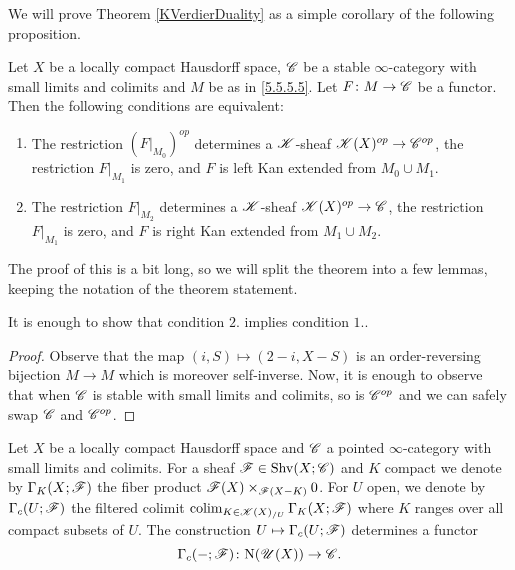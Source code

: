 \documentclass[../../thesis.tex]{subfiles}
\begin{document}
We will prove Theorem \ref{KVerdierDuality} as a simple corollary of the following proposition.
\begin{proposition}[{\cite[Proposition 5.5.5.7]{HA}}]\label{5.5.5.7}
    Let $X$ be a locally compact Hausdorff space, $\mathscr{C}$ be a stable $\infty$-category with small limits and colimits and $M$ be as in \ref{5.5.5.5}.
    Let $F \colon M \to \mathscr{C}$ be a functor.
    Then the following conditions are equivalent:
    \begin{enumerate}
        \item The restriction $(F|_{M_0})^{op}$ determines a $\mathscr{K}$-sheaf \hspace{0.25em}$\mathscr{K}(X)^{op} \to \mathscr{C}^{op}$, the restriction $F|_{M_1}$ is zero, and $F$ is left Kan extended from $M_0 \cup M_1$.
        \item The restriction $F|_{M_2}$ determines a $\mathscr{K}$-sheaf \hspace{0.25em}$\mathscr{K}(X)^{op} \to \mathscr{C}$, the restriction $F|_{M_1}$ is zero, and $F$ is right Kan extended from $M_1 \cup M_2$.
    \end{enumerate}
\end{proposition}
The proof of this is a bit long, so we will split the theorem into a few lemmas, keeping the notation of the theorem statement.
\begin{lemma}
    It is enough to show that condition $2.$ implies condition $1.$.
\end{lemma}
\begin{proof}
    Observe that the map $(i,S) \mapsto (2-i, X-S)$ is an order-reversing bijection $M\to M$ which is moreover self-inverse.
    Now, it is enough to observe that when $\mathscr{C}$ is stable with small limits and colimits, so is $\mathscr{C}^{op}$ and we can safely swap $\mathscr{C}$ and $\mathscr{C}^{op}$.
\end{proof}
\begin{definition}[{\cite[Definition 5.5.5.9]{HA}}]
    Let $X$ be a locally compact Hausdorff space and $\mathscr{C}$ a pointed $\infty$-category with small limits and colimits.
    For a sheaf $\mathscr{F} \in \mathrm{Shv}(X;\mathscr{C})$ and $K$ compact we denote by $\Gamma_K(X;\mathscr{F})$ the fiber product $\mathscr{F}(X)\times_{\mathscr{F}(X-K)}0$.
    For $U$ open, we denote by $\Gamma_c(U;\mathscr{F})$ the filtered colimit $\operatorname*{colim}_{K \in\mathscr{K}(X)_{/U}}\Gamma_K(X;\mathscr{F})$ where $K$ ranges over all compact subsets of $U$.
    The construction $U \mapsto \Gamma_c(U;\mathscr{F})$ determines a functor
    \[
        \Gamma_c({-} ;\mathscr{F}) \colon \mathrm{N}(\mathscr{U}(X)) \to \mathscr{C} .
    \]
\end{definition}
\end{document}
